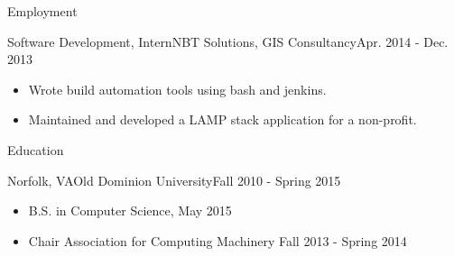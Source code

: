 \documentclass[]{mcdowellcv}
\begin{document}
\begin{cvsection}{Employment}
		\begin{cvsubsection}{Software Development, Intern}{NBT Solutions, GIS Consultancy}{Apr. 2014 - Dec. 2013}
			\begin{itemize}
				\item Wrote build automation tools using bash and jenkins.
				\item Maintained and developed a LAMP stack application for a non-profit.
			\end{itemize}
		\end{cvsubsection}

	\end{cvsection}

	\begin{cvsection}{Education}
		\begin{cvsubsection}{Norfolk, VA}{Old Dominion University}{Fall 2010 - Spring 2015}
			\begin{itemize}
				\item B.S. in Computer Science, May 2015
				\item Chair Association for Computing Machinery Fall 2013 - Spring 2014
			\end{itemize}
		\end{cvsubsection}
	\end{cvsection}
\end{document}
